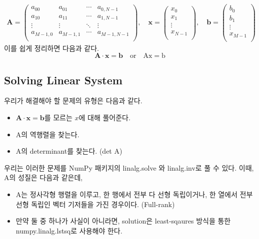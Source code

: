 \documentclass[11pt]{article}
\begin{document}
\begin{equation}
\begin{split}
\mathbf A = \left(
\begin{matrix}
a_{00} & a_{01} & \cdots & a_{0,N-1} \\
a_{10} & a_{11} & \cdots & a_{1,N-1} \\
\vdots & \vdots & \ddots & \vdots    \\
a_{M-1,0} & a_{M-1,1} & \cdots & a_{M-1,N-1} \\
\end{matrix}
\right)
,\quad
\mathbf x = \left(
\begin{matrix}
x_0 \\ x_1 \\ \vdots \\ x_{N - 1} \\
\end{matrix}
\right)
,\quad
\mathbf b = \left(
\begin{matrix}
b_0 \\ b_1 \\ \vdots \\ x_{M - 1} \\
\end{matrix}
\right)
\end{split}
\end{equation}
이를 쉽게 정리하면 다음과 같다.
\begin{equation}
\mathbf A \cdot \mathbf x = \mathbf b
\quad\text{or}\quad
\mathrm{Ax} = \mathrm b
\end{equation}

\subsection{Solving Linear System} 
우리가 해결해야 할 문제의 유형은 다음과 같다.
\begin{itemize}
    \item $\mathbf A \cdot \mathbf x = \mathbf b $를 모르는 $x$에 대해 풀어준다.
    \item A의 역행렬을 찾는다.
    \item A의 determinant를 찾는다. (det A)
\end{itemize}
우리는 이러한 문제를 NumPy 패키지의 linalg.solve 와 linalg.inv로 풀 수 있다. 이때, A의 성질은 다음과 같은데,
\begin{itemize}
    \item A는 정사각형 행렬을 이루고, 한 행에서 전부 다 선형 독립이거나, 한 열에서 전부 선형 독립인 벡터 기저들을 가진 경우이다. (Full-rank)
    \item 만약 둘 중 하나가 사실이 아니라면, solution은 least-sqaures 방식을 통한 numpy.linalg.lstsq로 사용해야 한다. 
\end{itemize}
\end{document}
